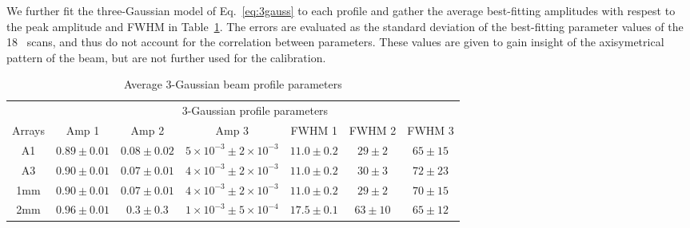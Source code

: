 We further fit the three-Gaussian model of Eq.~\ref{eq:3gauss} to each
profile and gather the average best-fitting amplitudes with respest to
the peak amplitude and FWHM in Table~\ref{tab:mean_3gauss_fit}. The
errors are evaluated as the standard deviation of the best-fitting
parameter values of the 18 \bm\ scans, and thus do not account for the
correlation between parameters. These values are given to gain insight
of the axisymetrical pattern of the beam, but are not further used for
the calibration. 


\begin{table}[th]
  \begin{center}
    \begin{tabular}{|c|c|c|c|c|c|c|}
      \hline
      & \multicolumn{6}{|c|}{3-Gaussian profile parameters}  \\\cline{1-7}
      Arrays       & Amp 1 & Amp 2 & Amp 3 & FWHM 1 & FWHM 2 & FWHM 3 \\
      \hline\hline
      A1        &  $0.89 \pm 0.01$   &  $0.08 \pm 0.02$  & $5 \times 10^{-3} \pm 2 \times 10^{-3}$  &  $11.0 \pm 0.2 $ & $29 \pm 2 $  & $65 \pm 15 $ \\  
      A3        &  $0.90 \pm 0.01$   &  $0.07 \pm 0.01$  & $4 \times 10^{-3} \pm 2 \times 10^{-3}$  &  $11.0 \pm 0.2 $ & $30 \pm 3 $  & $72 \pm 23 $ \\  
      1mm       &  $0.90 \pm 0.01$   &  $0.07 \pm 0.01$  & $4 \times 10^{-3} \pm 2 \times 10^{-3}$  &  $11.0 \pm 0.2 $ & $29 \pm 2 $  & $70 \pm 15 $ \\  
      2mm       &  $0.96 \pm 0.01$   &  $0.3 \pm 0.3$    & $1 \times 10^{-3} \pm 5 \times 10^{-4}$ &  $17.5 \pm 0.1 $ & $63 \pm 10 $ & $65 \pm 12 $ \\  
      \hline\hline
    \end{tabular}
    \caption[Average 3-Gaussian beam profile parameters]{Average 3-Gaussian beam profile parameters}
    \label{tab:mean_3gauss_fit}
  \end{center}
\end{table}
